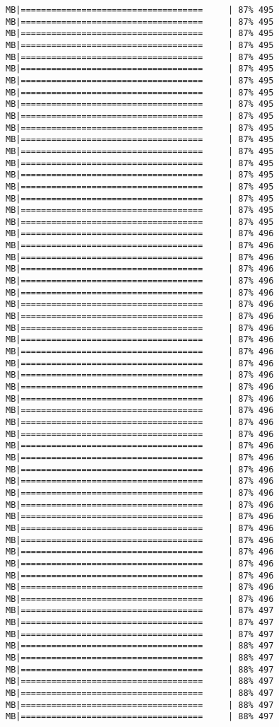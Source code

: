 \documentclass[
]{article}
\begin{document}
\begin{verbatim}
MB|====================================     | 87% 495 MB|====================================     | 87% 495 MB|====================================     | 87% 495 MB|====================================     | 87% 495 MB|====================================     | 87% 495 MB|====================================     | 87% 495 MB|====================================     | 87% 495 MB|====================================     | 87% 495 MB|====================================     | 87% 495 MB|====================================     | 87% 495 MB|====================================     | 87% 495 MB|====================================     | 87% 495 MB|====================================     | 87% 495 MB|====================================     | 87% 495 MB|====================================     | 87% 495 MB|====================================     | 87% 495 MB|====================================     | 87% 495 MB|====================================     | 87% 495 MB|====================================     | 87% 495 MB|====================================     | 87% 496 MB|====================================     | 87% 496 MB|====================================     | 87% 496 MB|====================================     | 87% 496 MB|====================================     | 87% 496 MB|====================================     | 87% 496 MB|====================================     | 87% 496 MB|====================================     | 87% 496 MB|====================================     | 87% 496 MB|====================================     | 87% 496 MB|====================================     | 87% 496 MB|====================================     | 87% 496 MB|====================================     | 87% 496 MB|====================================     | 87% 496 MB|====================================     | 87% 496 MB|====================================     | 87% 496 MB|====================================     | 87% 496 MB|====================================     | 87% 496 MB|====================================     | 87% 496 MB|====================================     | 87% 496 MB|====================================     | 87% 496 MB|====================================     | 87% 496 MB|====================================     | 87% 496 MB|====================================     | 87% 496 MB|====================================     | 87% 496 MB|====================================     | 87% 496 MB|====================================     | 87% 496 MB|====================================     | 87% 496 MB|====================================     | 87% 496 MB|====================================     | 87% 496 MB|====================================     | 87% 496 MB|====================================     | 87% 496 MB|====================================     | 87% 497 MB|====================================     | 87% 497 MB|====================================     | 87% 497 MB|====================================     | 88% 497 MB|====================================     | 88% 497 MB|====================================     | 88% 497 MB|====================================     | 88% 497 MB|====================================     | 88% 497 MB|====================================     | 88% 497 MB|====================================     | 88% 497 
\end{verbatim}
\end{document}

